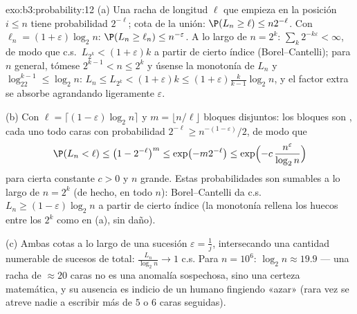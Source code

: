 \begin{solution}{exo:b3:probability:12}
(a) Una racha de longitud $\ell$ que empieza en la posición $i \leq n$
tiene probabilidad $2^{-\ell}$; cota de la unión: $\P(L_n \geq \ell)
\leq n2^{-\ell}$. Con $\ell_n = (1 +
\varepsilon)\log_2n$: $\P(L_n \geq \ell_n) \leq
n^{-\varepsilon}$. A lo largo de $n = 2^k$:
$\sum_k2^{-k\varepsilon} < \infty$, de modo que c.s.\ $L_{2^k} <
(1+\varepsilon)k$ a partir de cierto índice (Borel--Cantelli); para $n$
general, tómese $2^{k-1} < n \leq 2^k$ y úsense la monotonía de $L_n$ y
$\log_22^{k-1} \leq \log_2n$: $L_n \leq L_{2^k}
< (1 + \varepsilon)k \leq (1 + \varepsilon)\frac{k}{k-1}
\log_2n$, y el factor extra se absorbe agrandando ligeramente
$\varepsilon$.

(b) Con $\ell = \lceil(1 - \varepsilon)\log_2n\rceil$ y
$m = \lfloor n/\ell\rfloor$ bloques disjuntos: los bloques son
, cada uno todo
caras con probabilidad $2^{-\ell}
\geq n^{-(1-\varepsilon)}/2$, de modo que
\[
\P(L_n < \ell) \leq \bigl(1 - 2^{-\ell}\bigr)^{m}
\leq \exp\bigl(-m2^{-\ell}\bigr)
\leq \exp\Bigl(-c\,\frac{n^{\varepsilon}}{\log_2n}\Bigr)
\]
para cierta constante $c > 0$ y $n$ grande. Estas probabilidades son
sumables a lo largo de $n = 2^k$ (de hecho, en todo $n$):
Borel--Cantelli da c.s.\ $L_n \geq (1 -
\varepsilon)\log_2n$ a partir de cierto índice (la monotonía rellena los
huecos entre los $2^k$ como en (a), sin daño).

(c) Ambas cotas a lo largo de una sucesión $\varepsilon = \frac1j$,
intersecando una cantidad numerable de sucesos de
 total:
$\frac{L_n}{\log_2n} \to 1$ c.s. Para $n = 10^6$: $\log_2n
\approx 19.9$ --- una racha de $\approx 20$ caras no es una anomalía
sospechosa, sino una certeza matemática, y su ausencia es indicio de un
humano fingiendo «azar» (rara vez se atreve nadie a escribir más de $5$
o $6$ caras seguidas).
\end{solution}

